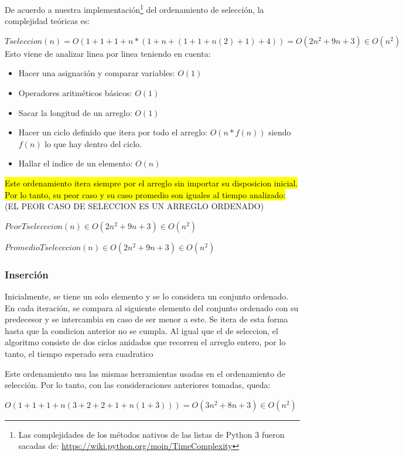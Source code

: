 \documentclass[article,a4paper]{article}
\begin{document}
De acuerdo a nuestra implementación\footnote{Las complejidades de los métodos nativos de las listas de Python 3 fueron sacadas de: \url{https://wiki.python.org/moin/TimeComplexity}} del ordenamiento de selección, la complejidad teóricas es:

$T seleccion(n) = O(1 + 1 + 1 + n * (1 + n + (1 + 1 + n (2) + 1)  + 4 ) ) = O(2n^2 + 9n + 3) \in O(n^2)$\\

Esto viene de analizar linea por linea teniendo en cuenta:
\begin{itemize}
\item Hacer una asignación y comparar variables: $O(1)$
\item Operadores aritméticos básicos: $O(1)$
\item Sacar la longitud de un arreglo: $O(1)$
\item Hacer un ciclo definido que itera por todo el arreglo: $O(n * f(n))$ siendo $f(n)$ lo que hay dentro del ciclo.
\item Hallar el indice de un elemento: $O(n)$
\end{itemize}

\hl{Este ordenamiento itera siempre por el arreglo sin importar su disposicion inicial. Por lo tanto, su peor caso y su caso promedio son iguales al tiempo analizado:} (EL PEOR CASO DE SELECCION ES UN ARREGLO ORDENADO)

$Peor T selecccion(n) \in O(2n^2 + 9n + 3) \in O(n^2)$ 

$Promedio T selecccion(n)  \in O(2n^2 + 9n + 3) \in O(n^2)$


\subsubsection{Inserción}

Inicialmente, se tiene un solo elemento y se lo considera un conjunto ordenado. En cada iteración, se compara al siguiente elemento del conjunto ordenado con su predecesor y se intercambia en caso de ser menor a este. Se itera de esta forma hasta que la condicion anterior no se cumpla. Al igual que el de seleccion, el algoritmo consiste de dos ciclos anidados que recorren el arreglo entero, por lo tanto, el tiempo esperado sera cuadratico

Este ordenamiento usa las mismas herramientas usadas en el ordenamiento de selección. Por lo tanto, con las consideraciones anteriores tomadas, queda:

$O( 1 + 1 + 1 + n(3 + 2 + 2 + 1 + n(1 + 3) ) ) = O(3n^2 + 8n + 3) \in O(n^2)$
\end{document}
